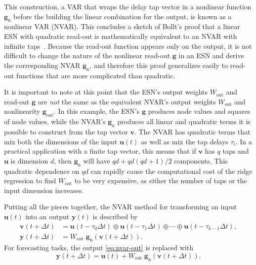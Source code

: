 This construction, a VAR that wraps the delay tap vector in a
nonlinear function $\bm{g}_\text{n}$ before the building the linear
combination for the output, is known as a nonlinear VAR (NVAR). This
concludes a sketch of Bollt's proof that a linear ESN with quadratic
read-out is mathematically equivalent to an NVAR with infinite
taps~\cite{bollt2021}. Because the read-out function appears only on
the output, it is not difficult to change the nature of the nonlinear
read-out $\bm{g}$ in an ESN and derive the corresponding NVAR $\bm{g}_\text{n}$,
and therefore this proof generalizes easily to read-out functions that are more
complicated than quadratic.

It is important to note at this point that the ESN's output weights
$W_\text{out}$ and read-out $\bm{g}$ are \emph{not} the same as the
equivalent NVAR's output weights $W_\text{out}$ and nonlinearity
$\bm{g}_\text{out}$. In this example, the ESN's $\bm{g}$ produces node values and squares of node
values, while the NVAR's $\bm{g}_\text{n}$ produces all linear and
quadratic terms it is possible to construct from the tap vector
$\bm{v}$. The NVAR has quadratic terms that mix both the dimensions of the input $\bm{u}(t)$ as well as mix the tap delays $\tau_i$. In a practical application with a finite tap vector, this
means that if $\bm{v}$ has $q$ taps and $\bm{u}$ is dimension $d$, then $\bm{g}_\text{n}$ will have
$qd + qd(qd+1)/2$ components. This quadratic dependence on $qd$ can
rapidly cause the computational cost of the ridge regression to find $W_\text{out}$ to be very
expensive, as either the number of taps or the input dimension increases.

Putting all the pieces together, the NVAR method for transforming an
input $\bm{u}(t)$ into an output $\bm{y}(t)$ is described by
\begin{align}
  \label{eq:nvar}
  \bm{v}(t + \Delta t) &= \bm{u}(t - \tau_0 \Delta t) \oplus \bm{u}(t - \tau_1 \Delta t) \oplus \cdots \oplus \bm{u}(t - \tau_{k-1} \Delta t), \\
  \label{eq:nvar-out}
  \bm{y}(t + \Delta t) &= W_\text{out}\;\bm{g}_\text{n}\left(\bm{v}(t + \Delta t)\right).
\end{align}
For forecasting tasks, the output \cref{eq:nvar-out} is replaced with
\begin{equation}
  \label{eq:nvar-out-forecast}
  \bm{y}(t + \Delta t) = \bm{u}(t) + W_\text{out}\;\bm{g}_\text{n}\left(\bm{v}(t + \Delta t)\right).
\end{equation}

